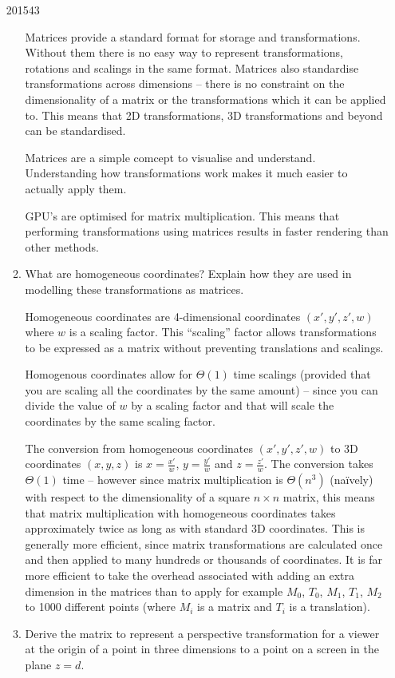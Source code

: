 \documentclass[10pt,\jkfside,a4paper]{article}
\begin{document}
\begin{enumerate}[label=(\alph*)]
\begin{examquestion}{2015}{4}{3}
\begin{enumerate}[label=(\alph*)]
Matrices provide a standard format for storage and transformations. Without them 
there is no easy way to represent transformations, rotations and scalings in the 
same format. Matrices also standardise transformations across dimensions -- there is 
no constraint on the dimensionality of a matrix or the transformations which it can 
be applied to. This means that 2D transformations, 3D transformations and beyond can 
be standardised.

Matrices are a simple comcept to visualise and understand. Understanding how transformations 
work makes it much easier to actually apply them.

GPU's are optimised for matrix multiplication. This means that performing transformations using 
matrices results in faster rendering than other methods.

\item What are homogeneous coordinates? Explain how they are used in modelling 
these transformations as matrices.

Homogeneous coordinates are 4-dimensional coordinates $(x', y', z', w)$ where 
$w$ is a scaling factor. This ``scaling'' factor allows transformations to be 
expressed as a matrix without preventing translations and scalings.

Homogenous coordinates allow for $\Theta(1)$ time scalings (provided that 
you are scaling all the coordinates by the same amount) -- since you can 
divide the value of $w$ by a scaling factor and that will scale the coordinates 
by the same scaling factor.

The conversion from homogeneous coordinates $(x', y', z', w)$ to 3D coordinates 
$(x, y, z)$ is $x = \frac{x'}{w}$, $y = \frac{y'}{w}$ and $z=\frac{z'}{w}$.
The conversion takes $\Theta(1)$ time -- however since matrix multiplication is 
$\Theta(n^3)$ (na\"ively) with respect to the dimensionality of a square $n\times n$ matrix, 
this means that matrix multiplication with homogeneous coordinates 
takes approximately twice as long as with standard 3D coordinates. This is generally 
more efficient, since matrix transformations are calculated once and then applied to 
many hundreds or thousands of coordinates. It is far more efficient to take the 
overhead associated with adding an extra dimension in the matrices than to apply 
for example $M_0$, $T_0$, $M_1$, $T_1$, $M_2$ to 1000 different points (where $M_i$ 
is a matrix and $T_i$ is a translation).

\item Derive the matrix to represent a perspective transformation for  a viewer at 
the origin of a point in three dimensions to a point on a screen in the plane $z = d$.


\end{enumerate}
\end{examquestion}
\end{enumerate}
\end{document}
